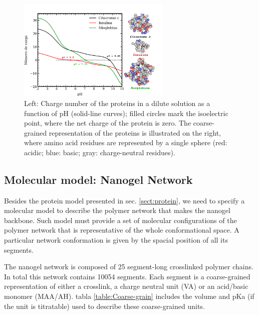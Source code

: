  \begin{figure}[!htb]
     \centering
     \includegraphics[width=0.65\textwidth]{Figures/graphs-gel2/protein-model.pdf}
     \caption{Left: Charge number of the proteins in a dilute solution as a function of  pH (solid-line curves);
     filled circles mark  the isoelectric point,
     where the net charge of the protein is zero.
     The coarse-grained representation of the proteins is illustrated on the right, where amino acid residues are represented by a single sphere (red: acidic; blue: basic; gray: charge-neutral residues).}
     \label{fig:esf:protein-charge}
 \end{figure}






 





\subsection{Molecular model: Nanogel Network}

Besides the protein model presented in sec.  \ref{sect:protein},   we need to specify a molecular model to describe the polymer network that makes the nanogel backbone.
Such model must provide  a set of molecular configurations of the polymer network that is representative of the whole conformational space.
A particular network conformation is given by the spacial position of all its segments.


The nanogel network is composed of 25 segment-long  crosslinked polymer chains. 
In total this network contains 10054 segments.
Each segment is a coarse-grained   representation of either a crosslink, a charge neutral unit (VA) or an acid/basic monomer (MAA/AH). 
tabla \ref{table:Coarse-grain} includes the volume and pKa (if the unit is titratable) used to describe these coarse-grained units.

